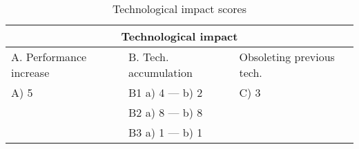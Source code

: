 \begin{table}[h]
\centering
\begin{tabular}{l l l}
\hline
\multicolumn{3}{|c|}{Technological impact} \\
\hline
A. Performance increase & B. Tech. accumulation & Obsoleting previous tech.\\
A) 5 & B1 a) 4 --- b) 2 & C) 3\\ 
     & B2 a) 8 --- b) 8 & \\
     & B3 a) 1 --- b) 1 & \\
\hline
\end{tabular}
\caption{Technological impact scores}
\label{tbl:impactscores3}
\end{table}